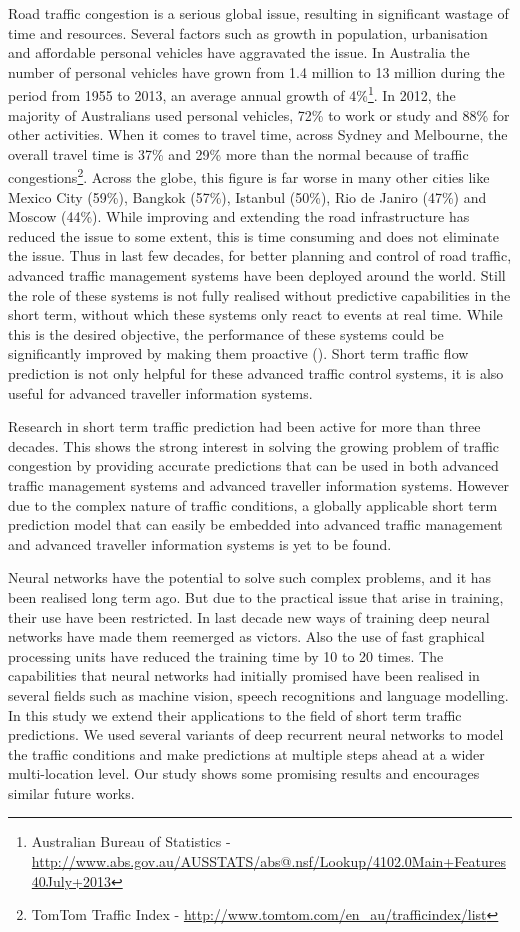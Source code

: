 Road traffic congestion is a serious global issue, resulting in significant wastage of time and
resources. Several factors such as growth in population, urbanisation and affordable personal vehicles
have aggravated the issue. In Australia the number of personal vehicles have grown from 1.4 million
to 13 million during the period from 1955 to 2013, an average annual growth of 4\%\footnote{Australian
Bureau of Statistics - \url{http://www.abs.gov.au/AUSSTATS/abs@.nsf/Lookup/4102.0Main+Features40July+2013}}.
In 2012, the majority of Australians used personal vehicles, 72\% to work or study and 88\% for other activities.
When it comes to travel time, across Sydney and Melbourne, the overall travel time is 37\% and 29\%
more than the normal because of traffic
congestions\footnote{TomTom Traffic Index - \url{http://www.tomtom.com/en_au/trafficindex/list}}.
Across the globe, this figure is far worse in many other cities like Mexico City (59\%), Bangkok (57\%),
Istanbul (50\%), Rio de Janiro (47\%) and Moscow (44\%). While improving and extending the road infrastructure has
reduced the issue to some extent, this is time consuming and does not eliminate the issue.
Thus in last few decades, for better planning and control of road traffic, advanced traffic
management systems have been deployed around the world. Still the role of these systems is not
fully realised without predictive capabilities in the short term, without which these systems only
react to events at real time. While this is the desired objective, the performance of these systems
could be significantly improved by making them proactive (\citet{smith1997traffic}). Short term traffic
flow prediction is not only helpful for these advanced traffic control systems, it is also useful
for advanced traveller information systems.


Research in short term traffic prediction had been active for more than three decades. This shows the
strong interest in solving the growing problem of traffic congestion by providing accurate predictions
that can be used in both advanced traffic management systems and advanced traveller information systems.
However due to the complex nature of traffic conditions, a globally applicable short term prediction
model that can easily be embedded into advanced traffic management and advanced traveller information
systems is yet to be found.

Neural networks have the potential to solve such complex problems, and it has been realised long term
ago. But due to the practical issue that arise in training, their use have been restricted. In last
decade new ways of training deep neural networks have made them reemerged as victors. Also the use
of fast graphical processing units have reduced the training time by 10 to 20 times. The capabilities
that neural networks had initially promised have been realised in several fields such as machine
vision, speech recognitions and language modelling. In this study we extend their
applications to the field of short term traffic predictions. We used several variants of deep recurrent
neural networks to model the traffic conditions and make predictions
at multiple steps ahead at a wider multi-location level. Our study shows some promising results and encourages
similar future works.


